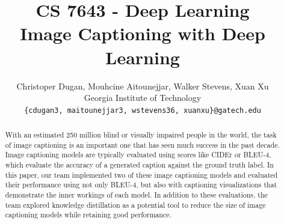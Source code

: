\documentclass[10pt,twocolumn,letterpaper]{article}
\begin{document}

\title{
CS 7643 - Deep Learning \\
Image Captioning with Deep Learning \\
}


\author{
Christoper Dugan, Mouhcine Aitounejjar, Walker Stevens, Xuan Xu\\
Georgia Institute of Technology\\
{\tt\small {\{cdugan3, maitounejjar3, wstevens36, xuanxu\}}@gatech.edu}
}

\maketitle


\begin{abstract}
   With an estimated 250 million blind or visually impaired people in the world, the task of image captioning is an important one that has seen much success in the past decade. Image captioning models are typically evaluated using scores like CIDEr or BLEU-4, which evaluate the accuracy of a generated caption against the ground truth label. In this paper, our team implemented two of these image captioning models and evaluated their performance using not only BLEU-4, but also with captioning visualizations that demonstrate the inner workings of each model. In addition to these evaluations, the team explored knowledge distillation as a potential tool to reduce the size of image captioning models while retaining good performance.
\end{abstract}


\end{document}
